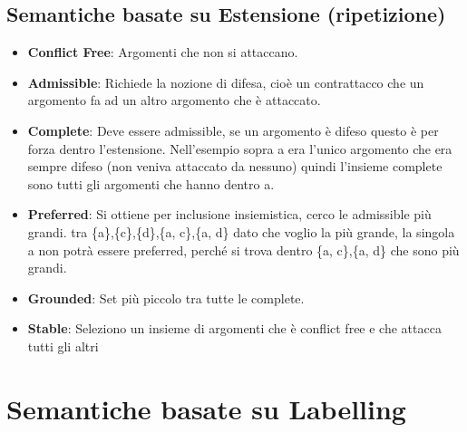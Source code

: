     \section{Semantiche basate su Estensione (ripetizione)}
    \begin{itemize}
        \item \textbf{Conflict Free}: Argomenti che non si attaccano.
        \item \textbf{Admissible}: Richiede la nozione di difesa, cioè un
              contrattacco che un argomento fa ad un altro argomento che è attaccato.
        \item \textbf{Complete}: Deve essere admissible, se un argomento è
              difeso questo è per forza dentro l'estensione. Nell'esempio sopra a era
              l'unico argomento che era sempre difeso (non veniva attaccato da
              nessuno) quindi l'insieme complete sono tutti gli argomenti che hanno
              dentro a.
        \item \textbf{Preferred}: Si ottiene per inclusione insiemistica, cerco
              le admissible più grandi. tra \{a\},\{c\},\{d\},\{a, c\},\{a, d\} dato
              che voglio la più grande, la singola {a} non potrà essere preferred,
              perché si trova dentro \{a, c\},\{a, d\} che sono più grandi.
        \item \textbf{Grounded}: Set più piccolo tra tutte le complete.
        \item \textbf{Stable}: Seleziono un insieme di argomenti che è conflict
              free e che attacca tutti gli altri
    \end{itemize}

    \chapter{Semantiche basate su Labelling} \label{ch:Semantiche basate su
        Labelling}
